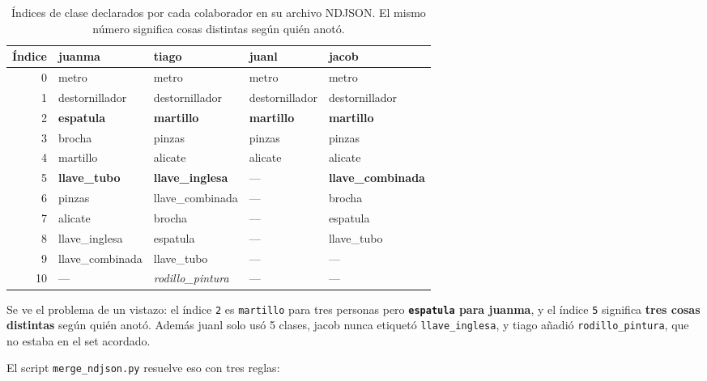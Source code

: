 \documentclass[11pt,a4paper]{article}
\newcommand{\clase}[1]{\texttt{#1}}
\begin{document}
\begin{table}[htbp]
\centering
\caption{Índices de clase declarados por cada colaborador en su archivo NDJSON. El mismo número
significa cosas distintas según quién anotó.}
\label{tab:ndjson}
\small
\begin{tabular}{@{}rllll@{}}
\toprule
\textbf{Índice} & \textbf{juanma} & \textbf{tiago} & \textbf{juanl} & \textbf{jacob} \\
\midrule
0  & metro                     & metro                     & metro          & metro \\
1  & destornillador            & destornillador            & destornillador & destornillador \\
2  & \textbf{espatula}         & \textbf{martillo}         & \textbf{martillo} & \textbf{martillo} \\
3  & brocha                    & pinzas                    & pinzas         & pinzas \\
4  & martillo                  & alicate                   & alicate        & alicate \\
5  & \textbf{llave\_tubo}      & \textbf{llave\_inglesa}   & ---            & \textbf{llave\_combinada} \\
6  & pinzas                    & llave\_combinada          & ---            & brocha \\
7  & alicate                   & brocha                    & ---            & espatula \\
8  & llave\_inglesa            & espatula                  & ---            & llave\_tubo \\
9  & llave\_combinada          & llave\_tubo               & ---            & --- \\
10 & ---                       & \emph{rodillo\_pintura}   & ---            & --- \\
\bottomrule
\end{tabular}
\end{table}

Se ve el problema de un vistazo: el índice \texttt{2} es \clase{martillo} para tres personas pero
\textbf{\clase{espatula} para juanma}, y el índice \texttt{5} significa \textbf{tres cosas
distintas} según quién anotó. Además juanl solo usó 5 clases, jacob nunca etiquetó
\clase{llave\_inglesa}, y tiago añadió \clase{rodillo\_pintura}, que no estaba en el set acordado.

El script \texttt{merge\_ndjson.py} resuelve eso con tres reglas:
\end{document}
